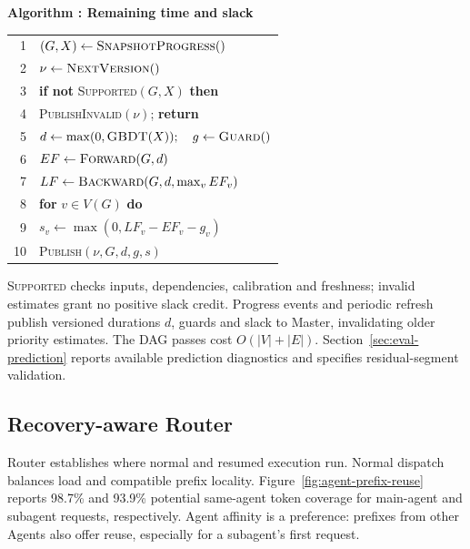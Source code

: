 \par\medskip\noindent\begin{minipage}{\columnwidth}
\raggedright
 \label{alg:workflow-tracker}
 \textbf{Algorithm \thedesignalgorithm: Remaining time and slack}
 \par\smallskip
 \begin{tabularx}{\columnwidth}{@{}r@{\quad}X@{}}
 \toprule
 1 & $(G,X)\gets\textsc{SnapshotProgress}()$ \\
 2 & $\nu\gets\textsc{NextVersion}()$ \\
 3 & \textbf{if not} \textsc{Supported}$(G,X)$ \textbf{then} \\
 4 & \quad \textsc{PublishInvalid}$(\nu)$; \textbf{return} \\
 5 & $d\gets\max(0,\textsc{GBDT}(X));\quad g\gets\textsc{Guard}()$ \\
 6 & $EF\gets\textsc{Forward}(G,d)$ \\
 7 & $LF\gets\textsc{Backward}(G,d,\max_v EF_v)$ \\
 8 & \textbf{for} $v\in V(G)$ \textbf{do} \\
 9 & \quad $s_v\gets\max(0,LF_v-EF_v-g_v)$ \\
 10 & \textsc{Publish}$(\nu,G,d,g,s)$ \\
 \bottomrule
 \end{tabularx}
\end{minipage}\par\medskip

\textsc{Supported} checks inputs, dependencies, calibration and freshness;
invalid estimates grant no positive slack credit. Progress events and
periodic refresh publish versioned durations $d$, guards and slack to
Master, invalidating older priority estimates. The DAG passes cost
$O(|V|+|E|)$. Section~\ref{sec:eval-prediction} reports available prediction
diagnostics and specifies residual-segment validation.

\subsection{Recovery-aware Router}
\label{sec:recovery-router}

Router establishes where normal and resumed execution run. Normal
dispatch balances load and compatible prefix locality.
Figure~\ref{fig:agent-prefix-reuse} reports 98.7\% and 93.9\% potential
same-agent token coverage for main-agent and subagent requests,
respectively. Agent affinity is a preference: prefixes from other Agents
also offer reuse, especially for a subagent's first request.


